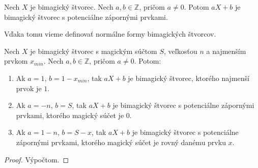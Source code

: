 \begin{consequence} Nech $X$ je bimagický štvorec. Nech $a,b \in \mathbb{Z}$, pričom $a \neq 0$. Potom $aX + b$ je bimagický štvorec s potenciálne zápornými prvkami.
\end{consequence}

Vďaka tomu vieme definovať normálne formy bimagických štvorcov.

\begin{theorem}
\label{5x5bimagic1}
Nech $X$ je bimagický štvorec s magickým súčtom $S$, veľkosťou $n$ a najmenším prvkom $x_{min}$. Nech $a,b \in \mathbb{Z}$, pričom $a \neq 0$. Potom:
\begin{enumerate}
\item Ak $a = 1$, $b = 1 - x_{min}$, tak $aX+b$ je bimagický štvorec, ktorého najmenší prvok je $1$.
\item Ak $a = -n$, $b = S$, tak $aX+b$ je bimagický štvorec s potenciálne zápornými prvkami, ktorého magický súčet je $0$.
\item Ak $a = 1-n$, $b = S-x$, tak $aX+b$ je bimagický štvorec s potenciálne zápornými prvkami, ktorého magický súčet je rovný danému prvku $x$.
\end{enumerate}
\end{theorem}

\begin{proof}
Výpočtom.
\end{proof}


